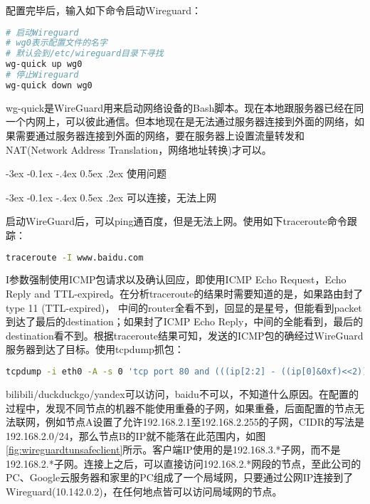 \documentclass[8pt]{book}
\makeatletter
\numberwithin{dummy}{section}
\theoremstyle{ocrenumbox}
\theoremstyle{blacknumex}
\theoremstyle{blacknumbox}
\theoremstyle{ocrenum}
\renewcommand{\subsection}{\@startsection {subsection}{2}{\z@}
	{-3ex \@plus -0.1ex \@minus -.4ex}
	{0.5ex \@plus.2ex }
	{\normalfont\sffamily\bfseries}}
\makeatother
\begin{document}
配置完毕后，输入如下命令启动Wireguard：

\begin{lstlisting}[language=Bash]
# 启动Wireguard
# wg0表示配置文件的名字
# 默认会到/etc/wireguard目录下寻找
wg-quick up wg0
# 停止Wireguard
wg-quick down wg0
\end{lstlisting}

wg-quick是WireGuard用来启动网络设备的Bash脚本。现在本地跟服务器已经在同一个内网上，可以彼此通信。但本地现在是无法通过服务器连接到外面的网络，如果需要通过服务器连接到外面的网络，要在服务器上设置流量转发和NAT(Network Address Translation，网络地址转换)才可以。

\subsection{使用问题}

\subsection{可以连接，无法上网}

启动WireGuard后，可以ping通百度，但是无法上网。使用如下traceroute命令跟踪：

\begin{lstlisting}[language=Bash]
traceroute -I www.baidu.com
\end{lstlisting}

I参数强制使用ICMP包请求以及确认回应，即使用ICMP Echo Request，Echo Reply and TTL-expired。在分析traceroute的结果时需要知道的是，如果路由封了type 11 (TTL-expired)， 中间的router全看不到，回显的是星号，但能看到packet到达了最后的destination；如果封了ICMP Echo Reply，中间的全能看到，最后的destination看不到。根据traceroute结果可知，发送的ICMP包的确经过WireGuard服务器到达了目标。使用tcpdump抓包：

\begin{lstlisting}[language=Bash]
tcpdump -i eth0 -A -s 0 'tcp port 80 and (((ip[2:2] - ((ip[0]&0xf)<<2)) - ((tcp[12]&0xf0)>>2)) != 0)'|grep "bilibili"
\end{lstlisting}

bilibili/duckduckgo/yandex可以访问，baidu不可以，不知道什么原因。在配置的过程中，发现不同节点的机器不能使用重叠的子网，如果重叠，后面配置的节点无法联网，例如节点A设置了允许192.168.2.1至192.168.2.255的子网，CIDR的写法是192.168.2.0/24，那么节点B的IP就不能落在此范围内，如图\ref{fig:wireguardtunsafeclient}所示。客户端IP使用的是192.168.3.*子网，而不是192.168.2.*子网。连接上之后，可以直接访问192.168.2.*网段的节点，至此公司的PC、Google云服务器和家里的PC组成了一个局域网，只要通过公网IP连接到了Wireguard(10.142.0.2)，在任何地点皆可以访问局域网的节点。
\end{document}
